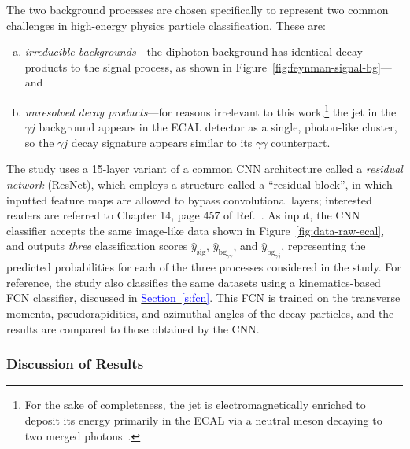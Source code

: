 \documentclass[11pt, a4paper]{article}
\newcommand{\myhref}[2]{\hyperref[#1]{\textcolor{blue}{#2}}}
\begin{document}
The two background processes are chosen specifically to represent two common challenges in high-energy physics particle classification.
These are:
\begin{enumerate}[(a)]

    \item \textit{irreducible backgrounds}---the diphoton background has identical decay products to the signal process, as shown in Figure~\ref{fig:feynman-signal-bg}---and %

    \item \textit{unresolved decay products}---for reasons irrelevant to this work,\footnote{For the sake of completeness, the jet is electromagnetically enriched to deposit its energy primarily in the ECAL via a neutral meson decaying to two merged photons~\cite{andrews-higgs, data-bg-jet}.} the jet in the $ \gamma j $ background appears in the ECAL detector as a single, photon-like cluster, so the $ \gamma j $ decay signature appears similar to its $ \gamma \gamma $ counterpart.

\end{enumerate}
The study uses a 15-layer variant of a common CNN architecture called a \textit{residual network} (ResNet), which employs a structure called a ``residual block'', in which inputted feature maps are allowed to bypass convolutional layers; interested readers are referred to Chapter 14, page 457 of Ref.~\cite{homl}.
As input, the CNN classifier accepts the same image-like data shown in Figure~\ref{fig:data-raw-ecal}, and outputs \textit{three} classification scores $ \hat{y}_{\text{sig}} $, $ \hat{y}_{\text{bg}_{\gamma\gamma}} $, and $ \hat{y}_{\text{bg}_{\gamma j}} $, representing the predicted probabilities for each of the three processes considered in the study.
For reference, the study also classifies the same datasets using a kinematics-based FCN classifier, discussed in \myhref{s:fcn}{Section~\ref{s:fcn}}.
This FCN is trained on the transverse momenta, pseudorapidities, and azimuthal angles of the decay particles, and the results are compared to those obtained by the CNN.

\subsubsection{Discussion of Results}
\end{document}
